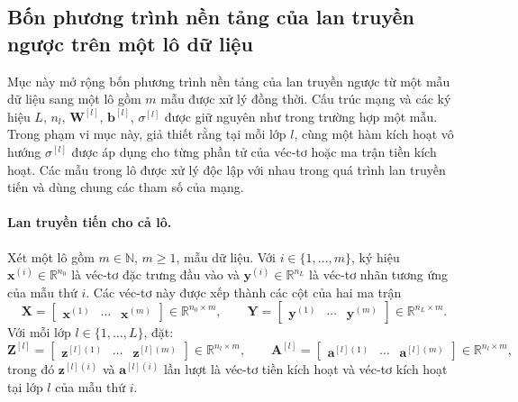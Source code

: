 \subsection{Bốn phương trình nền tảng của lan truyền ngược trên một lô dữ liệu}
Mục này mở rộng bốn phương trình nền tảng của lan truyền ngược từ một mẫu dữ liệu sang một lô gồm $m$ mẫu được xử lý đồng thời. Cấu trúc mạng và các ký hiệu $L$, $n_l$, $\mathbf{W}^{[l]}$, $\mathbf{b}^{[l]}$, $\sigma^{[l]}$
được giữ nguyên như trong trường hợp một mẫu. Trong phạm vi mục này, giả thiết rằng tại mỗi lớp $l$, cùng một hàm kích hoạt vô hướng $\sigma^{[l]}$ được áp dụng cho từng phần tử của véc-tơ hoặc ma trận tiền kích hoạt. Các mẫu trong lô được xử lý độc lập với nhau trong quá trình lan truyền tiến và dùng chung các tham số của mạng.

\paragraph{Lan truyền tiến cho cả lô.\\}
Xét một lô gồm $m\in\mathbb{N}$, $m\geq 1$, mẫu dữ liệu.
Với $i\in\{1,\ldots,m\}$, ký hiệu
$\mathbf{x}^{(i)}\in\mathbb{R}^{n_0}$ là véc-tơ đặc trưng đầu vào và $\mathbf{y}^{(i)}\in\mathbb{R}^{n_L}$ là véc-tơ nhãn tương ứng của mẫu thứ $i$. Các véc-tơ này được xếp thành các cột của hai ma trận
\[\mathbf{X}
=\begin{bmatrix}
\mathbf{x}^{(1)} & \cdots & \mathbf{x}^{(m)}
\end{bmatrix}
\in\mathbb{R}^{n_0\times m},
\qquad
\mathbf{Y}
=\begin{bmatrix}
\mathbf{y}^{(1)} & \cdots & \mathbf{y}^{(m)}
\end{bmatrix}
\in\mathbb{R}^{n_L\times m}.\]
Với mỗi lớp $l\in\{1,\ldots,L\}$, đặt:
\[\mathbf{Z}^{[l]}
=\begin{bmatrix}
\mathbf{z}^{[l](1)} & \cdots & \mathbf{z}^{[l](m)}
\end{bmatrix}
\in\mathbb{R}^{n_l\times m},
\qquad
\mathbf{A}^{[l]}
=\begin{bmatrix}
\mathbf{a}^{[l](1)} & \cdots & \mathbf{a}^{[l](m)}
\end{bmatrix}
\in\mathbb{R}^{n_l\times m},\]
trong đó $\mathbf{z}^{[l](i)}$ và $\mathbf{a}^{[l](i)}$ lần lượt là véc-tơ tiền kích hoạt và véc-tơ kích hoạt tại lớp $l$ của mẫu thứ $i$.

